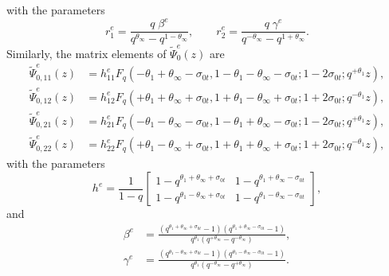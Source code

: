 \documentclass[a4paper,reqno,11pt]{amsart}
\numberwithin{equation}{section}
\numberwithin{figure}{section}
\theoremstyle{plain}
\theoremstyle{remark}
\numberwithin{rhp}{section}
\begin{document}
with the parameters
\begin{equation}\label{eq:defir12e}
    r_1^e=\frac{q\;\beta^e}{q^{\theta_\infty}-q^{1-\theta_\infty}}, \qquad  r_2^e=\frac{q\;\gamma^e}{q^{-\theta_\infty}-q^{1+\theta_\infty}}.
\end{equation}
Similarly, the matrix elements of $\widetilde{\Psi}_{0}^e(z)$ are
\begin{equation}
\begin{split}
\widetilde{\Psi}_{0,{11}}^e(z)&= h_{11}^eF_q\left(-\theta_1+\theta_\infty-\sigma_{0t},1-\theta_1-\theta_\infty-\sigma_{0t};1-2\sigma_{0t};
q^{+\theta_1}z\right),\\
\widetilde{\Psi}_{0,{12}}^e(z)&= h_{12}^eF_q\left(+\theta_1+\theta_\infty+\sigma_{0t},1+\theta_1-\theta_\infty+\sigma_{0t};1+2\sigma_{0t};
q^{-\theta_1}z\right),\\
\widetilde{\Psi}_{0,{21}}^e(z)&= h_{21}^eF_q\left(-\theta_1-\theta_\infty-\sigma_{0t},1-\theta_1+\theta_\infty-\sigma_{0t};1-2\sigma_{0t};
q^{+\theta_1}z\right),\\
\widetilde{\Psi}_{0,{22}}^e(z)&= h_{22}^eF_q\left(+\theta_1-\theta_\infty+\sigma_{0t},1+\theta_1+\theta_\infty+\sigma_{0t};1+2\sigma_{0t};
q^{-\theta_1}z\right),
\end{split}\label{exp:psihat0e}
\end{equation}
with the parameters
\begin{equation}\label{eq:he}
h^e=\frac{1}{1-q}\begin{bmatrix}
1-q^{\theta_1+\theta_\infty+\sigma_{0t}} & 1-q^{\theta_1+\theta_\infty-\sigma_{0t}}\\
1-q^{\theta_1-\theta_\infty+\sigma_{0t}} & 1-q^{\theta_1-\theta_\infty-\sigma_{0t}}
\end{bmatrix},
\end{equation}
and
\begin{align}
\beta^e&=\frac{(q^{\theta_1+\theta_\infty+\sigma_{0t}}-1)(q^{\theta_1+\theta_\infty-\sigma_{0t}}-1)}{q^{\theta_1}(q^{+\theta_\infty}-q^{-\theta_\infty})},\label{eq:betae}\\
\gamma^e&=\frac{(q^{\theta_1-\theta_\infty+\sigma_{0t}}-1)(q^{\theta_1-\theta_\infty-\sigma_{0t}}-1)}{q^{\theta_1}(q^{-\theta_\infty}-q^{+\theta_\infty})}.\nonumber
\end{align}
\end{document}
